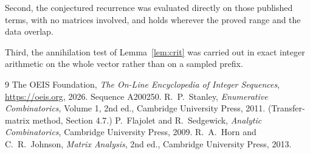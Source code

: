 \documentclass[11pt,a4paper]{article}
\theoremstyle{plain}
\theoremstyle{definition}
\begin{document}
Second, the conjectured recurrence was evaluated directly on those published terms, with no
matrices involved, and holds wherever the proved range and the data overlap.

Third, the annihilation test of Lemma~\ref{lem:crit} was carried out in exact integer
arithmetic on the whole vector rather than on a sampled prefix.

\begin{thebibliography}{9}
 The OEIS Foundation, \emph{The On-Line Encyclopedia of Integer
Sequences}, \url{https://oeis.org}, 2026. Sequence A200250.
 R.~P.~Stanley, \emph{Enumerative Combinatorics}, Volume 1, 2nd ed.,
Cambridge University Press, 2011. (Transfer-matrix method, Section 4.7.)
 P.~Flajolet and R.~Sedgewick, \emph{Analytic Combinatorics}, Cambridge
University Press, 2009.
 R.~A.~Horn and C.~R.~Johnson, \emph{Matrix Analysis}, 2nd ed., Cambridge
University Press, 2013.
\end{thebibliography}
\end{document}
